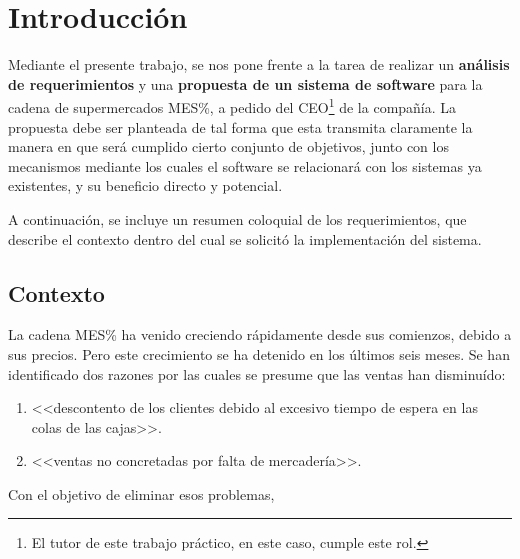 
\section{Introducción}

Mediante el presente trabajo, se nos pone frente a la tarea de realizar un
\textbf{análisis de requerimientos} y una \textbf{propuesta de un sistema de
software} para la cadena de supermercados MES\%, a pedido del CEO\footnote{El
tutor de este trabajo práctico, en este caso, cumple este rol.} de la compañía.
La propuesta debe ser planteada de tal forma que esta transmita claramente la
manera en que será cumplido cierto conjunto de objetivos, junto con los
mecanismos mediante los cuales el software se relacionará con los sistemas ya
existentes, y su beneficio directo y potencial.

A continuación, se incluye un resumen coloquial de los requerimientos, que
describe el contexto dentro del cual se solicitó la implementación del sistema.

\subsection{Contexto}

La cadena MES\% ha venido creciendo rápidamente desde sus comienzos, debido a
sus precios. Pero este crecimiento se ha detenido en los últimos seis meses. Se
han identificado dos razones por las cuales se presume que las ventas han
disminuído: 
\begin{enumerate}
  \item <<descontento de los clientes debido al excesivo tiempo de espera 
  en las colas de las cajas>>.
  \item <<ventas no concretadas por falta de mercadería>>.
\end{enumerate}
Con el objetivo de eliminar esos problemas, \fixme

